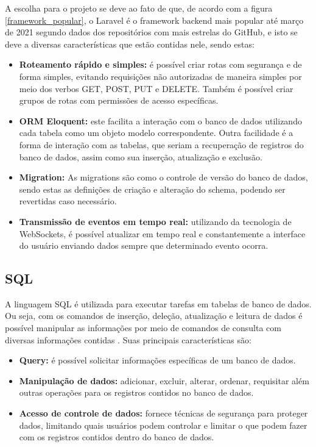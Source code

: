 A escolha para o projeto se deve ao fato de que, de acordo com a figura \ref{framework_popular}, o Laravel é o framework backend mais popular até março de 2021 segundo dados dos repositórios com mais estrelas do GitHub, e isto se deve a diversas características que estão contidas nele, sendo estas:
\begin{itemize}
    \item \textbf{Roteamento rápido e simples:} é possível criar rotas com segurança e de forma simples, evitando requisições não autorizadas de maneira simples por meio dos verbos GET, POST, PUT e DELETE. Também é possível criar grupos de rotas com permissões de acesso específicas.
    \item \textbf{ORM Eloquent:} este facilita a interação com o banco de dados utilizando cada tabela como um objeto modelo correspondente. Outra facilidade é a forma de interação com as tabelas, que seriam a recuperação de registros do banco de dados, assim como sua inserção, atualização e exclusão.
    \item \textbf{Migration:} As migrations são como o controle de versão do banco de dados, sendo estas as definições de criação e alteração do schema, podendo ser revertidas caso necessário.
    \item \textbf{Transmissão de eventos em tempo real:} utilizando da tecnologia de WebSockets, é possível atualizar em tempo real e constantemente a interface do usuário enviando dados sempre que determinado evento ocorra.
\end{itemize}

\subsection{SQL}
A linguagem SQL é utilizada para executar tarefas em tabelas de banco de dados. Ou seja, com os comandos de inserção, deleção, atualização e leitura de dados é possível manipular as informações por meio de comandos de consulta com diversas informações contidas \cite{HEUSER}. Suas principais características são:
\begin{itemize}
    \item \textbf{Query:} é possível solicitar informações específicas de um banco de dados.
    \item \textbf{Manipulação de dados:} adicionar, excluir, alterar, ordenar, requisitar além outras operações para os registros contidos no banco de dados.
    \item \textbf{Acesso de controle de dados:} fornece técnicas de segurança para proteger dados, limitando quais usuários podem controlar e limitar o que podem fazer com os registros contidos dentro do banco de dados.
\end{itemize}
